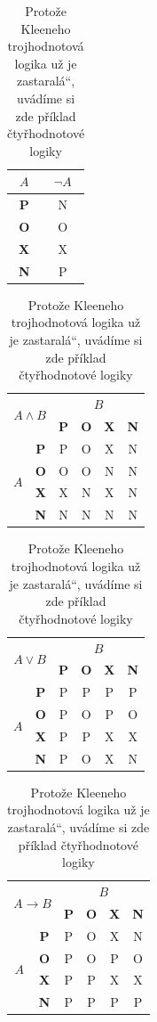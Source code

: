 \documentclass[a4paper, 11pt]{article}
\renewcommand{\uv}[1]{\quotedblbase #1\textquotedblleft}
\begin{document}
\begin{table}[h]
\centering
\begin{tabular}{|c|c|}
\hline
    $A$ & $\neg A$  \\ \hline
    \textbf{P} & N \\ \hline
    \textbf{O} & O \\ \hline
    \textbf{X} & X \\ \hline
    \textbf{N} & P \\
\hline
\end{tabular}
\begin{tabular}{|c|c|c|c|c|c|}
\hline
    \multicolumn{2}{|c|}{\multirow{2}{*}{$A \land B$}} & \multicolumn{4}{c|}{$B$} \\
    \cline{3-6}
    \multicolumn{2}{|c|}{} & \textbf{P} & \textbf{O} & \textbf{X} & \textbf{N} \\
    \cline{1-6}
    \multirow{4}{*}{$A$} & \textbf{P} & P & O & X & N \\
    \cline{2-6}
    & \textbf{O} & O & O & N & N \\
    \cline{2-6}
    & \textbf{X} & X & N & X & N \\
    \cline{2-6}
    & \textbf{N} & N & N & N & N \\
\hline
\end{tabular}
\begin{tabular}{|c|c|c|c|c|c|}
\hline
    \multicolumn{2}{|c|}{\multirow{2}{*}{$A \lor B$}} & \multicolumn{4}{c|}{$B$} \\
    \cline{3-6}
    \multicolumn{2}{|c|}{} & \textbf{P} & \textbf{O} & \textbf{X} & \textbf{N} \\
    \cline{1-6}
    \multirow{4}{*}{$A$} & \textbf{P} & P & P & P & P \\
    \cline{2-6}
    & \textbf{O} & P & O & P & O \\
    \cline{2-6}
    & \textbf{X} & P & P & X & X \\
    \cline{2-6}
    & \textbf{N} & P & O & X & N \\
\hline
\end{tabular}
\begin{tabular}{|c|c|c|c|c|c|}
\hline
    \multicolumn{2}{|c|}{\multirow{2}{*}{$A \rightarrow B$}} & \multicolumn{4}{c|}{$B$} \\
    \cline{3-6}
    \multicolumn{2}{|c|}{} & \textbf{P} & \textbf{O} & \textbf{X} & \textbf{N} \\
    \cline{1-6}
    \multirow{4}{*}{$A$} & \textbf{P} & P & O & X & N \\
    \cline{2-6}
    & \textbf{O} & P & O & P & O \\
    \cline{2-6}
    & \textbf{X} & P & P & X & X \\
    \cline{2-6}
    & \textbf{N} & P & P & P & P \\
\hline
\end{tabular} \caption{Protože Kleeneho trojhodnotová logika už je \uv{zastaralá}, uvádíme si zde příklad čtyřhodnotové logiky} \label{tab:2}
\end{table}
\bigskip
\pagebreak
\end{document}
